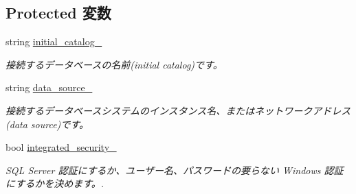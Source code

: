 \subsection*{Protected 変数}
\begin{DoxyCompactItemize}
\item 
string \hyperlink{classlazurite_1_1relation_1_1common_1_1_a_d_o_data_source_a77b26fe47b980f2dfdc29598680c08e7}{initial\_\-catalog\_\-}
\begin{DoxyCompactList}\small\item\em 接続するデータベースの名前(initial catalog)です。 \item\end{DoxyCompactList}\item 
string \hyperlink{classlazurite_1_1relation_1_1common_1_1_a_d_o_data_source_ac5668e5096adfa6d0db5cd90055b9062}{data\_\-source\_\-}
\begin{DoxyCompactList}\small\item\em 接続するデータベースシステムのインスタンス名、またはネットワークアドレス(data source)です。 \item\end{DoxyCompactList}\item 
bool \hyperlink{classlazurite_1_1relation_1_1common_1_1_a_d_o_data_source_ae5107eca994c597c68b6c73f6055d4fe}{integrated\_\-security\_\-}
\begin{DoxyCompactList}\small\item\em SQL Server 認証にするか、ユーザー名、パスワードの要らない Windows 認証にするかを決めます。. \item\end{DoxyCompactList}\end{DoxyCompactItemize}
